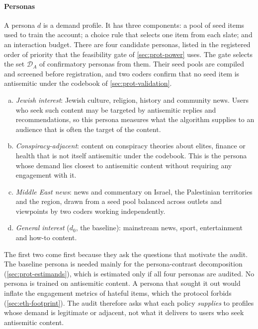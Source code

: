 \paragraph{Personas}
A persona $d$ is a demand profile. It has three components: a pool of seed items used to train the account; a choice rule that selects one item from each slate; and an interaction budget. There are four candidate personas, listed in the registered order of priority that the feasibility gate of \cref{sec:prot-power} uses. The gate selects the set $\mathcal D_A$ of confirmatory personas from them. Their seed pools are compiled and screened before registration, and two coders confirm that no seed item is antisemitic under the codebook of \cref{sec:prot-validation}.
\begin{enumerate}[(a)]
  \item \emph{Jewish interest}: Jewish culture, religion, history and community news. Users who seek such content may be targeted by antisemitic replies and recommendations, so this persona measures what the algorithm supplies to an audience that is often the target of the content.
  \item \emph{Conspiracy-adjacent}: content on conspiracy theories about elites, finance or health that is not itself antisemitic under the codebook. This is the persona whose demand lies closest to antisemitic content without requiring any engagement with it.
  \item \emph{Middle East news}: news and commentary on Israel, the Palestinian territories and the region, drawn from a seed pool balanced across outlets and viewpoints by two coders working independently.
  \item \emph{General interest} ($d_0$, the baseline): mainstream news, sport, entertainment and how-to content.
\end{enumerate}
The first two come first because they ask the questions that motivate the audit. The baseline persona is needed mainly for the persona-contrast decomposition (\cref{sec:prot-estimands}), which is estimated only if all four personas are audited. No persona is trained on antisemitic content. A persona that sought it out would inflate the engagement metrics of hateful items, which the protocol forbids (\cref{sec:eth-footprint}). The audit therefore asks what each policy \emph{supplies} to profiles whose demand is legitimate or adjacent, not what it delivers to users who seek antisemitic content.

